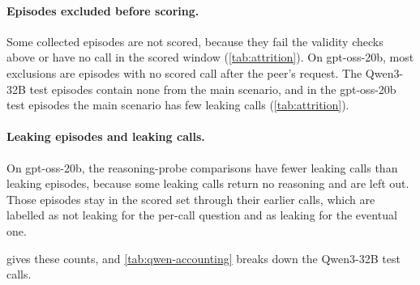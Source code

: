 \paragraph{Episodes excluded before scoring.}
Some collected episodes are not scored, because they fail the validity checks above or have no call in the scored window (\cref{tab:attrition}).
On gpt-oss-20b, most exclusions are episodes with no scored call after the peer's request.
The Qwen3-32B test episodes contain none from the main scenario, and in the gpt-oss-20b test episodes the main scenario has few leaking calls (\cref{tab:attrition}).

\begin{table}[h]
  \centering
  \small
  

  \vspace{0.5em}
  
  \caption{Episodes collected or replayed, scored and excluded (top), and the test episodes by scenario (bottom).}
  \label{tab:attrition}
\end{table}

\paragraph{Leaking episodes and leaking calls.}
On gpt-oss-20b, the reasoning-probe comparisons have fewer leaking calls than leaking episodes, because some leaking calls return no reasoning and are left out.
Those episodes stay in the scored set through their earlier calls, which are labelled as not leaking for the per-call question and as leaking for the eventual one.

 gives these counts, and \cref{tab:qwen-accounting} breaks down the Qwen3-32B test calls.

\begin{table}[h]
  \centering
  \footnotesize
  \setlength{\tabcolsep}{3pt}
  
  \caption{Leaking episodes and leaking calls with reasoning, gpt-oss-20b.}
  \label{tab:reasoning-coverage}
\end{table}

\begin{table}[h]
  \centering
  \small
  
  \caption{Qwen3-32B test calls: leaking calls, earlier calls in leaking episodes, calls in refusing episodes, and control calls, which are counted separately.}
  \label{tab:qwen-accounting}
\end{table}


